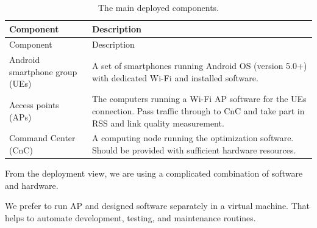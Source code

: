 \begin{longtable}[]{@{}ll@{}}
\caption{The main deployed components.}\tabularnewline
\toprule
\begin{minipage}[b]{0.16\columnwidth}\raggedright
Component\strut
\end{minipage} & \begin{minipage}[b]{0.78\columnwidth}\raggedright
Description\strut
\end{minipage}\tabularnewline
\midrule
\endfirsthead
\toprule
\begin{minipage}[b]{0.16\columnwidth}\raggedright
Component\strut
\end{minipage} & \begin{minipage}[b]{0.78\columnwidth}\raggedright
Description\strut
\end{minipage}\tabularnewline
\midrule
\endhead
\begin{minipage}[t]{0.16\columnwidth}\raggedright
Android smartphone group (UEs)\strut
\end{minipage} & \begin{minipage}[t]{0.78\columnwidth}\raggedright
A set of smartphones running Android OS (version 5.0+) with dedicated
Wi-Fi and installed software.\strut
\end{minipage}\tabularnewline
\begin{minipage}[t]{0.16\columnwidth}\raggedright
Access points (APs)\strut
\end{minipage} & \begin{minipage}[t]{0.78\columnwidth}\raggedright
The computers running a Wi-Fi AP software for the UEs connection. Pass
traffic through to CnC and take part in RSS and link quality
measurement.\strut
\end{minipage}\tabularnewline
\begin{minipage}[t]{0.16\columnwidth}\raggedright
Command Center (CnC)\strut
\end{minipage} & \begin{minipage}[t]{0.78\columnwidth}\raggedright
A computing node running the optimization software. Should be provided
with sufficient hardware resources.\strut
\end{minipage}\tabularnewline
\bottomrule
\end{longtable}

From the deployment view, we are using a complicated combination of
software and hardware.

We prefer to run AP and designed software separately in a virtual
machine. That helps to automate development, testing, and maintenance
routines.

